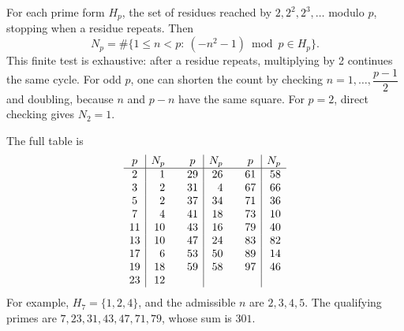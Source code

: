 For each prime form $H_p$, the set of residues reached by $2,2^2,2^3,\ldots$ modulo $p$, stopping when a residue repeats. Then
\[N_p=\#\{1\le n<p:\ (-n^2-1)\bmod p\in H_p\}.\]
This finite test is exhaustive: after a residue repeats, multiplying by 2 continues the same cycle. For odd $p$, one can shorten the count by checking $n=1,\ldots,\dfrac{p-1}{2}$ and doubling, because $n$ and $p-n$ have the same square. For $p=2$, direct checking gives $N_2=1$.

The full table is
\[\begin{array}{c|r@{\qquad}c|r@{\qquad}c|r}
p&N_p&p&N_p&p&N_p\\\hline
2&1&29&26&61&58\\
3&2&31&4&67&66\\
5&2&37&34&71&36\\
7&4&41&18&73&10\\
11&10&43&16&79&40\\
13&10&47&24&83&82\\
17&6&53&50&89&14\\
19&18&59&58&97&46\\
23&12&&&&
\end{array}\]
For example, $H_7=\{1,2,4\}$, and the admissible $n$ are $2,3,4,5$. The qualifying primes are $7,23,31,43,47,71,79$, whose sum is $\boxed{301}$.
